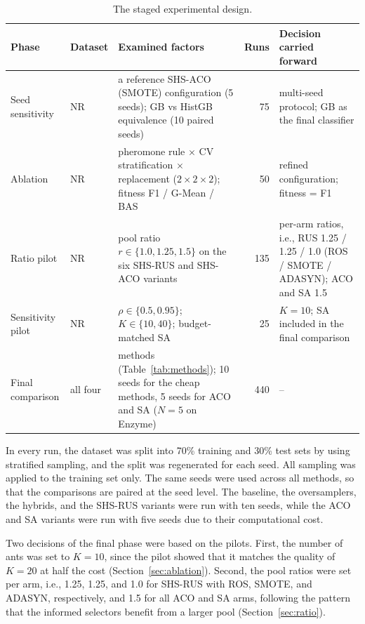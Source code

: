 \documentclass[pdflatex,sn-basic]{sn-jnl}
\begin{document}
\begin{table}[htbp]
\centering
\caption{The staged experimental design.}
\label{tab:phases}
\footnotesize
\begin{tabular}{>{\raggedright\arraybackslash}p{18mm}>{\raggedright\arraybackslash}p{9mm}>{\raggedright\arraybackslash}p{42mm}r>{\raggedright\arraybackslash}p{30mm}}
\toprule
Phase & Dataset & Examined factors & Runs & Decision carried forward \\
\midrule
Seed sensitivity & NR &
  a reference SHS-ACO (SMOTE) configuration (5 seeds); GB vs HistGB
  equivalence (10 paired seeds) & 75 &
  multi-seed protocol; GB as the final classifier \\
\addlinespace[2pt]
Ablation & NR &
  pheromone rule $\times$ CV stratification $\times$ replacement
  ($2\times2\times2$); fitness F1 / G-Mean / BAS & 50 &
  refined configuration; fitness = F1 \\
\addlinespace[2pt]
Ratio pilot & NR &
  pool ratio $r \in \{1.0, 1.25, 1.5\}$ on the six SHS-RUS and SHS-ACO
  variants & 135 &
  per-arm ratios, i.e., RUS 1.25 / 1.25 / 1.0 (ROS / SMOTE / ADASYN); ACO and SA 1.5 \\
\addlinespace[2pt]
Sensitivity pilot & NR &
  $\rho \in \{0.5, 0.95\}$; $K \in \{10, 40\}$; budget-matched SA & 25 &
  $K = 10$; SA included in the final comparison \\
\addlinespace[2pt]
Final comparison & all four &
  13 methods (Table~\ref{tab:methods}); 10 seeds for the cheap methods,
  5 seeds for ACO and SA ($N = 5$ on Enzyme) & 440 & -- \\
\bottomrule
\end{tabular}
\end{table}

In every run, the dataset was split into 70\% training and 30\% test
sets by using stratified sampling, and the split was regenerated for
each seed. All sampling was applied to the training set only. The same
seeds were used across all methods, so that the comparisons are paired
at the seed level. The baseline, the oversamplers, the hybrids, and the
SHS-RUS variants were run with ten seeds, while the ACO and SA variants
were run with five seeds due to their computational cost.

Two decisions of the final phase were based on the pilots. First, the
number of ants was set to $K = 10$, since the pilot showed that it
matches the quality of $K = 20$ at half the cost
(Section~\ref{sec:ablation}). Second, the pool ratios were set per arm,
i.e., 1.25, 1.25, and 1.0 for SHS-RUS with ROS, SMOTE, and ADASYN,
respectively, and 1.5 for all ACO and SA arms, following the pattern
that the informed selectors benefit from a larger pool
(Section~\ref{sec:ratio}).
\end{document}
